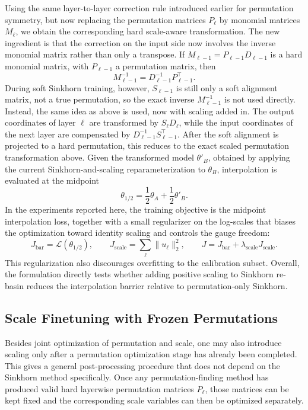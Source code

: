 \documentclass[11pt,a4paper]{report}
\begin{document}
Using the same layer-to-layer correction rule introduced earlier for permutation symmetry, but now replacing the permutation matrices \(P_\ell\) by monomial matrices \(M_\ell\), we obtain the corresponding hard scale-aware transformation. The new ingredient is that the correction on the input side now involves the inverse monomial matrix rather than only a transpose. If \(M_{\ell-1}=P_{\ell-1}D_{\ell-1}\) is a hard monomial matrix, with \(P_{\ell-1}\) a permutation matrix, then
\[
M_{\ell-1}^{-1}
=
D_{\ell-1}^{-1}P_{\ell-1}^{\top}.
\]
During soft Sinkhorn training, however, \(S_{\ell-1}\) is still only a soft alignment matrix, not a true permutation, so the exact inverse \(M_{\ell-1}^{-1}\) is not used directly. Instead, the same idea as above is used, now with scaling added in. The output coordinates of layer \(\ell\) are transformed by \(S_\ell D_\ell\), while the input coordinates of the next layer are compensated by \(D_{\ell-1}^{-1}S_{\ell-1}^{\top}\). After the soft alignment is projected to a hard permutation, this reduces to the exact scaled permutation transformation above. Given the transformed model $\theta'_B$, obtained by applying the current Sinkhorn-and-scaling reparameterization to $\theta_B$, interpolation is evaluated at the midpoint
\[
\theta_{1/2}
=
\frac{1}{2}\theta_A+\frac{1}{2}\theta'_B.
\]
In the experiments reported here, the training objective is the midpoint interpolation loss, together with a small regularizer on the log-scales that biases the optimization toward identity scaling and controls the gauge freedom:
\[
J_{\mathrm{bar}}
=
\mathcal{L}(\theta_{1/2}),
\qquad
J_{\mathrm{scale}}
=
\sum_{\ell}\|u_\ell\|_2^2,
\qquad
J=J_{\mathrm{bar}}+\lambda_{\mathrm{scale}}J_{\mathrm{scale}}.
\]
This regularization also discourages overfitting to the calibration subset. Overall, the formulation directly tests whether adding positive scaling to Sinkhorn re-basin reduces the interpolation barrier relative to permutation-only Sinkhorn.

\subsection{Scale Finetuning with Frozen Permutations}

Besides joint optimization of permutation and scale, one may also introduce scaling only after a permutation optimization stage has already been completed. This gives a general post-processing procedure that does not depend on the Sinkhorn method specifically. Once any permutation-finding method has produced valid hard layerwise permutation matrices \(P_\ell\), those matrices can be kept fixed and the corresponding scale variables can then be optimized separately.
\end{document}
